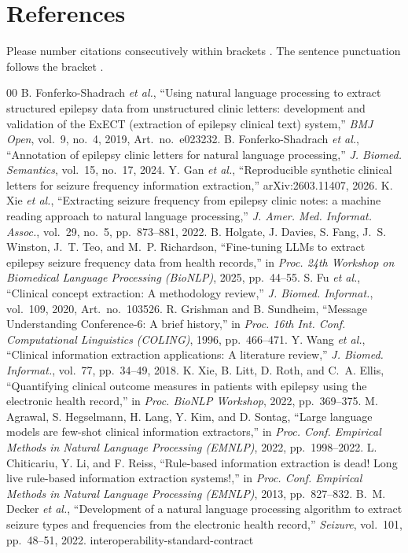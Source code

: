 \documentclass[conference]{IEEEtran}
\begin{document}
\section*{References}

Please number citations consecutively within brackets \cite{b1}. The 
sentence punctuation follows the bracket \cite{b2}. 

\begin{thebibliography}{00}
 B. Fonferko-Shadrach \emph{et al.}, ``Using natural language processing to extract structured epilepsy data from unstructured clinic letters: development and validation of the ExECT (extraction of epilepsy clinical text) system,'' \emph{BMJ Open}, vol.~9, no.~4, 2019, Art.~no.~e023232.
 B. Fonferko-Shadrach \emph{et al.}, ``Annotation of epilepsy clinic letters for natural language processing,'' \emph{J. Biomed. Semantics}, vol.~15, no.~17, 2024.
 Y. Gan \emph{et al.}, ``Reproducible synthetic clinical letters for seizure frequency information extraction,'' arXiv:2603.11407, 2026.
 K. Xie \emph{et al.}, ``Extracting seizure frequency from epilepsy clinic notes: a machine reading approach to natural language processing,'' \emph{J. Amer. Med. Informat. Assoc.}, vol.~29, no.~5, pp.~873--881, 2022.
 B. Holgate, J. Davies, S. Fang, J.~S. Winston, J.~T. Teo, and M.~P. Richardson, ``Fine-tuning LLMs to extract epilepsy seizure frequency data from health records,'' in \emph{Proc. 24th Workshop on Biomedical Language Processing (BioNLP)}, 2025, pp.~44--55.
 S. Fu \emph{et al.}, ``Clinical concept extraction: A methodology review,'' \emph{J. Biomed. Informat.}, vol.~109, 2020, Art.~no.~103526.
 R. Grishman and B. Sundheim, ``Message Understanding Conference-6: A brief history,'' in \emph{Proc. 16th Int. Conf. Computational Linguistics (COLING)}, 1996, pp.~466--471.
 Y. Wang \emph{et al.}, ``Clinical information extraction applications: A literature review,'' \emph{J. Biomed. Informat.}, vol.~77, pp.~34--49, 2018.
 K. Xie, B. Litt, D. Roth, and C.~A. Ellis, ``Quantifying clinical outcome measures in patients with epilepsy using the electronic health record,'' in \emph{Proc. BioNLP Workshop}, 2022, pp.~369--375.
 M. Agrawal, S. Hegselmann, H. Lang, Y. Kim, and D. Sontag, ``Large language models are few-shot clinical information extractors,'' in \emph{Proc. Conf. Empirical Methods in Natural Language Processing (EMNLP)}, 2022, pp.~1998--2022.
 L. Chiticariu, Y. Li, and F. Reiss, ``Rule-based information extraction is dead! Long live rule-based information extraction systems!,'' in \emph{Proc. Conf. Empirical Methods in Natural Language Processing (EMNLP)}, 2013, pp.~827--832.
 B.~M. Decker \emph{et al.}, ``Development of a natural language processing algorithm to extract seizure types and frequencies from the electronic health record,'' \emph{Seizure}, vol.~101, pp.~48--51, 2022.
 interoperability-standard-contract
\end{thebibliography}

\vspace{12pt}
\end{document}
